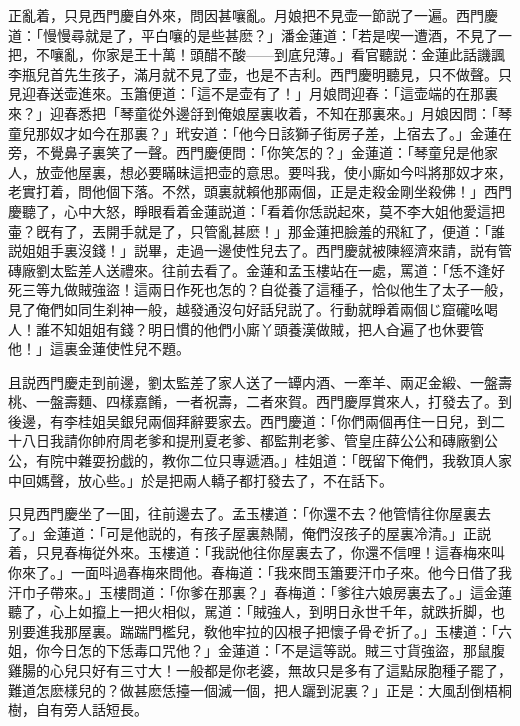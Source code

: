 正亂着，只見西門慶自外來，問因甚嚷亂。月娘把不見壶一節説了一遍。西門慶道：「慢慢尋就是了，平白嚷的是些甚麽？」潘金蓮道：「若是喫一遭酒，不見了一把，不嚷亂，你家是王十萬！頭醋不酸——到底兒薄。」看官聽説：金蓮此話譏諷李瓶兒首先生孩子，滿月就不見了壶，也是不吉利。西門慶明聽見，只不做聲。只見迎春送壶進來。玉簫便道：「這不是壶有了！」月娘問迎春：「這壶端的在那裏來？」迎春悉把「琴童從外邊㧱到俺娘屋裏收着，不知在那裏來。」月娘因問：「琴童兒那奴才如今在那裏？」玳安道：「他今日該獅子街房子差，上宿去了。」金蓮在旁，不覺鼻子裏笑了一聲。西門慶便問：「你笑怎的？」金蓮道：「琴童兒是他家人，放壶他屋裏，想必要瞞昧這把壶的意思。要呌我，使小廝如今呌將那奴才來，老實打着，問他個下落。不然，頭裏就賴他那兩個，正是走殺金剛坐殺佛！」西門慶聽了，心中大怒，睜眼看着金蓮説道：「看着你恁説起來，莫不李大姐他愛這把壷？旣有了，丟開手就是了，只管亂甚麽！」那金蓮把臉羞的飛紅了，便道：「誰説姐姐手裏沒錢！」説畢，走過一邊使性兒去了。西門慶就被陳經濟來請，説有管磚廠劉太監差人送禮來。往前去看了。金蓮和孟玉樓站在一處，罵道：「恁不逢好死三等九做賊強盜！這兩日作死也怎的？自從養了這種子，恰似他生了太子一般，見了俺們如同生刹神一般，越發通沒句好話兒説了。行動就睜着兩個じ窟礲吆喝人！誰不知姐姐有錢？明日慣的他們小廝丫頭養漢做賊，把人㒲遍了也休要管他！」這裏金蓮使性兒不題。

且説西門慶走到前邊，劉太監差了家人送了一罈内酒、一牽羊、兩疋金緞、一盤壽桃、一盤壽麵、四樣嘉餚，一者祝壽，二者來賀。西門慶厚賞來人，打發去了。到後邊，有李桂姐吴銀兒兩個拜辭要家去。西門慶道：「你們兩個再住一日兒，到二十八日我請你帥府周老爹和提刑夏老爹、都監荆老爹、管皇庄薛公公和磚廠劉公公，有院中雜耍扮戯的，教你二位只專遞酒。」桂姐道：「旣留下俺們，我敎頂人家中回媽聲，放心些。」於是把兩人轎子都打發去了，不在話下。

只見西門慶坐了一囬，往前邊去了。孟玉樓道：「你還不去？他管情往你屋裏去了。」金蓮道：「可是他説的，有孩子屋裏熱鬧，俺們沒孩子的屋裏冷清。」正説着，只見春梅従外來。玉樓道：「我説他往你屋裏去了，你還不信哩！這春梅來叫你來了。」一面呌過春梅來問他。春梅道：「我來問玉簫要汗巾子來。他今日借了我汗巾子帶來。」玉樓問道：「你爹在那裏？」春梅道：「爹往六娘房裏去了。」這金蓮聽了，心上如攛上一把火相似，駡道：「賊強人，到明日永世千年，就跌折脚，也别要進我那屋裏。踹踹門檻兒，敎他牢拉的囚根子把懷子骨ぞ折了。」玉樓道：「六姐，你今日怎的下恁毒口咒他？」金蓮道：「不是這等説。賊三寸貨強盜，那鼠腹雞腸的心兒只好有三寸大！一般都是你老婆，無故只是多有了這點尿胞種子罷了，難道怎麽樣兒的？做甚麽恁擡一個滅一個，把人躧到泥裏？」正是：大風刮倒梧桐樹，自有旁人話短長。

